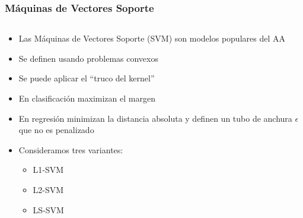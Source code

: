\documentclass[aspectratio=43,spanish]{beamer}
\begin{document}
\begin{frame}
      \frametitle{Máquinas de Vectores Soporte}

      \begin{columns}
            \begin{column}{0.5\textwidth}
                  \begin{itemize}
                        \item  Las Máquinas de Vectores Soporte (SVM) son modelos populares del AA
                        \item Se definen usando problemas convexos
                        \item Se puede aplicar el ``truco del kernel''
                        \item En clasificación maximizan el margen
                        \item En regresión minimizan la distancia absoluta y definen un tubo de anchura $\epsilon$ que no es penalizado
                        \item Consideramos tres variantes: 
                        \begin{itemize}
                              \item L1-SVM
                              \item L2-SVM
                              \item LS-SVM
                           \end{itemize}
                  \end{itemize}
                  

\end{column}
\end{columns}
\end{frame}
\end{document}
